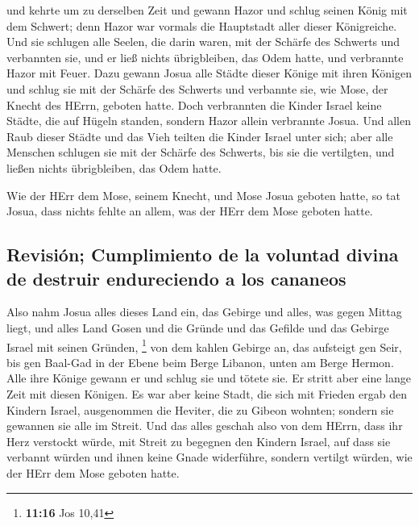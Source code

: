  und kehrte um zu derselben Zeit und gewann Hazor und
schlug seinen König mit dem Schwert; denn Hazor war vormals die
Hauptstadt aller dieser Königreiche.  Und sie schlugen
alle Seelen, die darin waren, mit der Schärfe des Schwerts und
verbannten sie, und er ließ nichts übrigbleiben, das Odem hatte, und
verbrannte Hazor mit Feuer.  Dazu gewann Josua alle
Städte dieser Könige mit ihren Königen und schlug sie mit der Schärfe
des Schwerts und verbannte sie, wie Mose, der Knecht des HErrn, geboten
hatte.  Doch verbrannten die Kinder Israel keine Städte,
die auf Hügeln standen, sondern Hazor allein verbrannte Josua.
 Und allen Raub dieser Städte und das Vieh teilten die
Kinder Israel unter sich; aber alle Menschen schlugen sie mit der
Schärfe des Schwerts, bis sie die vertilgten, und ließen nichts
übrigbleiben, das Odem hatte.

 Wie der HErr dem Mose, seinem Knecht, und Mose Josua
geboten hatte, so tat Josua, dass nichts fehlte an allem, was der HErr
dem Mose geboten hatte.

\hypertarget{revisiuxf3n-cumplimiento-de-la-voluntad-divina-de-destruir-endureciendo-a-los-cananeos}{%
\subsection{Revisión; Cumplimiento de la voluntad divina de destruir
endureciendo a los
cananeos}\label{revisiuxf3n-cumplimiento-de-la-voluntad-divina-de-destruir-endureciendo-a-los-cananeos}}

 Also nahm Josua alles dieses Land ein, das Gebirge und
alles, was gegen Mittag liegt, und alles Land Gosen und die Gründe und
das Gefilde und das Gebirge Israel mit seinen Gründen, \footnote{\textbf{11:16}
  Jos 10,41}  von dem kahlen Gebirge an, das aufsteigt
gen Seir, bis gen Baal-Gad in der Ebene beim Berge Libanon, unten am
Berge Hermon. Alle ihre Könige gewann er und schlug sie und tötete sie.
 Er stritt aber eine lange Zeit mit diesen Königen.
 Es war aber keine Stadt, die sich mit Frieden ergab den
Kindern Israel, ausgenommen die Heviter, die zu Gibeon wohnten; sondern
sie gewannen sie alle im Streit.  Und das alles geschah
also von dem HErrn, dass ihr Herz verstockt würde, mit Streit zu
begegnen den Kindern Israel, auf dass sie verbannt würden und ihnen
keine Gnade widerführe, sondern vertilgt würden, wie der HErr dem Mose
geboten hatte.


